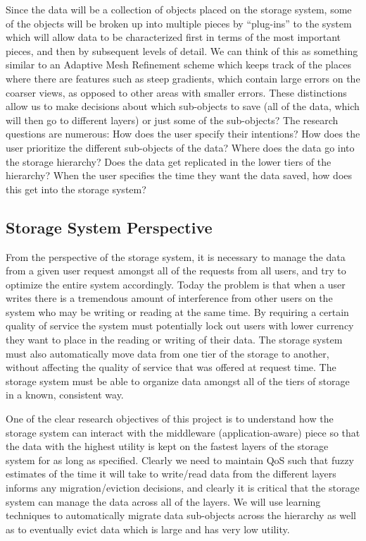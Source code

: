 Since the data will be a collection of objects placed on the storage system,
some of the objects will be broken up into multiple pieces by ``plug-ins''
to the system which will allow data to be characterized first in terms of the most
important pieces, and then by subsequent levels of detail. We can think of this as
something similar to an Adaptive Mesh Refinement scheme which keeps track of
the places where there are features such as steep gradients, which contain large errors on the
coarser views, as opposed to other areas with smaller errors. These distinctions allow us to make decisions
about which sub-objects to save (all of the data, which will then go to
different layers) or just some of the sub-objects? The research questions
are numerous: How does the user specify their intentions? How does the user
prioritize the different sub-objects of the data? Where does the data go
into the storage hierarchy? Does the data get replicated in the lower tiers
of the hierarchy? When the user specifies the time they want the data saved,
how does this get into the storage system?

\subsection{Storage System Perspective}
\label{subsec:storage-perspective}
From the perspective of the storage system, it is necessary to manage the data from
a given user request amongst all of the requests from all users, and try to optimize the
entire system accordingly. Today the problem is that when a user writes there is a
tremendous amount of interference from other users on the system who may be
writing or reading at the same time. By requiring a certain quality
of service the system must potentially lock out users with lower currency
they want to place in the reading or writing of their data. The storage
system must also automatically move data from one tier of the storage to
another, without affecting the quality of service that was offered at request
time. The storage system must be able to organize
data amongst all of the tiers of storage in a known, consistent way.

One of the clear research objectives of this project is to understand how the
storage system can interact with the middleware (application-aware) piece so
that the data with the highest utility is kept on the fastest layers of the
storage system for as long as specified. Clearly we need to maintain 
QoS such that fuzzy estimates of the time it will take to write/read data from
the different layers informs any migration/eviction decisions, and clearly it
is critical that the storage system can manage the data across all of the
layers. We will use learning techniques to automatically migrate data
sub-objects across the hierarchy as well as to eventually evict data which is
large and has very low utility.


